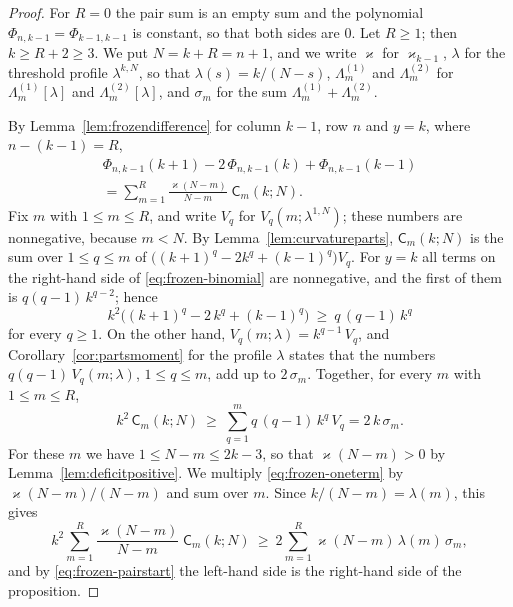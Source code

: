 \documentclass{amsart}
\theoremstyle{definition}
\theoremstyle{remark}
\numberwithin{equation}{section}
\begin{document}
\begin{proof}
For $R=0$ the pair sum is an empty sum and the polynomial
$\Phi_{n,k-1}=\Phi_{k-1,k-1}$ is constant, so that both sides are $0$. Let
$R\ge1$; then $k\ge R+2\ge3$. We put $N=k+R=n+1$, and we write
$\varkappa$ for $\varkappa_{k-1}$, $\lambda$
for the threshold profile $\lambda^{k,N}$, so that $\lambda(s)=k/(N-s)$,
$\Lambda^{(1)}_m$ and $\Lambda^{(2)}_m$ for $\Lambda^{(1)}_m[\lambda]$ and
$\Lambda^{(2)}_m[\lambda]$, and $\sigma_m$ for the sum
$\Lambda^{(1)}_m+\Lambda^{(2)}_m$.

By Lemma~\ref{lem:frozendifference} for column $k-1$, row $n$ and
$y=k$, where $n-(k-1)=R$,
\begin{multline}\label{eq:frozen-pairstart}
\Phi_{n,k-1}(k+1)-2\,\Phi_{n,k-1}(k)+\Phi_{n,k-1}(k-1)\\
=\sum_{m=1}^{R}\frac{\varkappa(N-m)}{N-m}\;\mathsf C_m(k;N).
\end{multline}
Fix $m$ with $1\le m\le R$, and
write $V_q$ for $V_q(m;\lambda^{1,N})$; these numbers are nonnegative,
because $m<N$. By Lemma~\ref{lem:curvatureparts}, $\mathsf C_m(k;N)$ is the
sum over $1\le q\le m$ of
$\bigl((k+1)^q-2k^q+(k-1)^q\bigr)V_q$. For $y=k$ all terms on the right-hand
side of \eqref{eq:frozen-binomial} are nonnegative, and the first of them is
$q(q-1)\,k^{q-2}$; hence
\[
k^2\bigl((k+1)^q-2\,k^q+(k-1)^q\bigr)\ \ge\ q\,(q-1)\,k^q
\]
for every $q\ge1$. On the other hand, $V_q(m;\lambda)=k^{q-1}\,V_q$, and
Corollary~\ref{cor:partsmoment} for the profile $\lambda$ states that the
numbers $q(q-1)\,V_q(m;\lambda)$, $1\le q\le m$, add up to $2\,\sigma_m$.
Together, for every $m$ with $1\le m\le R$,
\begin{equation}\label{eq:frozen-oneterm}
k^2\,\mathsf C_m(k;N)\ \ge\ \sum_{q=1}^{m}q\,(q-1)\,k^q\,V_q
=2\,k\,\sigma_m .
\end{equation}
For these $m$ we have $1\le N-m\le 2k-3$, so that $\varkappa(N-m)>0$ by
Lemma~\ref{lem:deficitpositive}. We multiply \eqref{eq:frozen-oneterm} by
$\varkappa(N-m)/(N-m)$ and sum over $m$. Since $k/(N-m)=\lambda(m)$, this
gives
\begin{equation}\label{eq:frozen-lowerbound}
k^2\sum_{m=1}^{R}\frac{\varkappa(N-m)}{N-m}\;\mathsf C_m(k;N)\ \ge\
2\sum_{m=1}^{R}\varkappa(N-m)\,\lambda(m)\,\sigma_m ,
\end{equation}
and by \eqref{eq:frozen-pairstart} the left-hand side is the right-hand side
of the proposition.


\end{proof}
\end{document}
